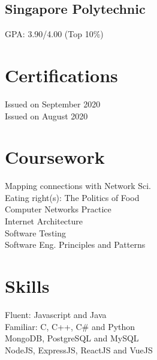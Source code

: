 \documentclass[a4paper]{resume-template} %
\begin{document}
\begin{minipage}[t]{0.34\textwidth}
\subsection{Singapore Polytechnic}
GPA: 3.90/4.00 (Top 10\%)
\sectionsep


\section{Certifications}
Issued on September 2020\\
Issued on August 2020
\sectionsep


\section{Coursework}
Mapping connections with Network Sci.\\
Eating right(s): The Politics of Food\\
Computer Networks Practice\\ 
Internet Architecture\\ 
Software Testing\\ 
Software Eng. Principles and Patterns\\ 
\sectionsep


\section{Skills}
Fluent: Javascript and Java\\
Familiar: C, C++, C\# and Python\\
MongoDB, PostgreSQL and MySQL \\
NodeJS, ExpressJS, ReactJS and VueJS
\sectionsep

%
%

\end{minipage} 
\end{document}
